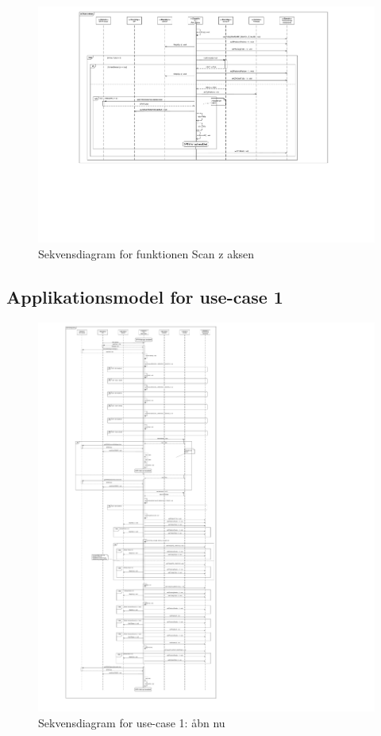 \begin{figure}[H]
	\caption{Sekvensdiagram for funktionen Scan z aksen}
	\label{SD:PSoC:ScanX}
	\includegraphics[scale=0.29,trim=200 100 0 0, clip]{APPSoC/SD-Scan-z-aksen}
\end{figure}

\subsection{Applikationsmodel for use-case 1}

\begin{figure}[H]
	\caption{Sekvensdiagram for use-case 1: åbn nu}
	\label{SD:PSoC:UC1}
	\includegraphics[scale=0.2,trim=0 0 0 0, clip]{APPSoC/UC1-Aaben-nu-v1-simplified}
\end{figure}

